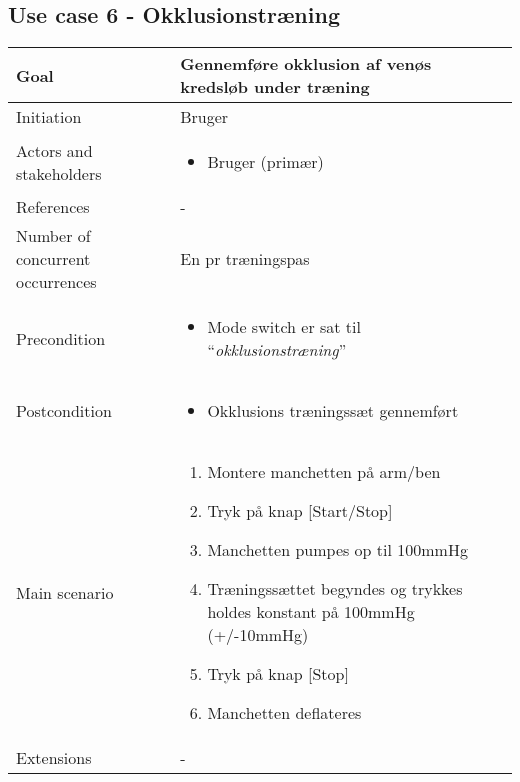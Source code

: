 	\subsection{Use case 6 - Okklusionstræning}
		\begin{center}
			\begin{tabular}{ | p{} | p{}| } 
				\hline
				Goal& Gennemføre okklusion af venøs kredsløb under træning  \\ 
				\hline
				Initiation &  Bruger\\
				\hline
				Actors and stakeholders & 
				\begin{itemize}
					\item Bruger (primær)
				\end{itemize} \\ 
				\hline
				References & - \\ 
				\hline
				Number of concurrent occurrences & En pr træningspas \\ 
				\hline	
				Precondition & 
				\begin{itemize}
					\item Mode switch er sat til  “\textit{okklusionstræning}”
 				\end{itemize} \\ 
				\hline
				Postcondition & 
				\begin{itemize}
					\item Okklusions træningssæt gennemført
				\end{itemize} \\ 
				\hline
				Main scenario & \begin{enumerate}
					\setlength\itemsep{0cm} %
					\item Montere manchetten på arm/ben
					\item Tryk på knap [Start/Stop]
					\item Manchetten pumpes op til 100mmHg
					\item Træningssættet begyndes og trykkes holdes konstant på 100mmHg (+/-10mmHg)
					\item Tryk på knap [Stop]
					\item Manchetten deflateres
				\end{enumerate} \\ 
				\hline
				Extensions & - \\ 
				\hline
			\end{tabular}
		\end{center}
	\pagebreak
		